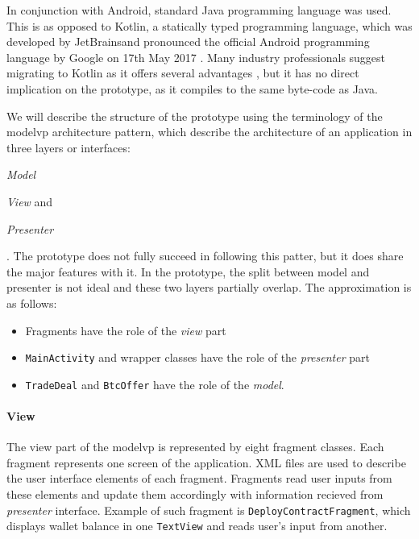 In conjunction with Android, standard Java programming language was used. This is as opposed to Kotlin, a statically typed programming language, which was developed by JetBrains\footnotemark and pronounced the official Android programming language by Google on 17th May 2017 \cite{Vasic2017MasteringKotlin}. 
% 
% 
Many industry professionals suggest migrating to Kotlin as it offers several advantages \cite{Vasic2017MasteringKotlin} \footnotemark, but it has no direct implication on the prototype, as it compiles to the same byte-code as Java.
% 

We will describe the structure of the prototype using the terminology of the \acrfull{modelvp} architecture pattern, which describe the architecture of an application in three layers or interfaces:
\begin{enumerate*}[label=(\roman*)]
    \item \textit{Model}
    \item \textit{View} and
    \item \textit{Presenter}
\end{enumerate*}.
The prototype does not fully succeed in following this patter, but it does share the major features with it. In the prototype, the split between model and presenter is not ideal and these two layers partially overlap. The approximation is as follows:
\begin{itemize}[noitemsep]
    \item Fragments have the role of the \textit{view} part
    \item \texttt{MainActivity} and wrapper classes have the role of the \textit{presenter} part
    \item \texttt{TradeDeal} and \texttt{BtcOffer} have the role of the \textit{model}.
\end{itemize}

\paragraph{View} The view part of the \acrshort{modelvp} is represented by eight fragment classes. Each fragment represents one screen of the application. XML files are used to describe the user interface elements of each fragment. Fragments read user inputs from these elements and update them accordingly with information recieved from \textit{presenter} interface. Example of such fragment is \texttt{DeployContractFragment}, which displays wallet balance in one \texttt{TextView} and reads user's input from another.


